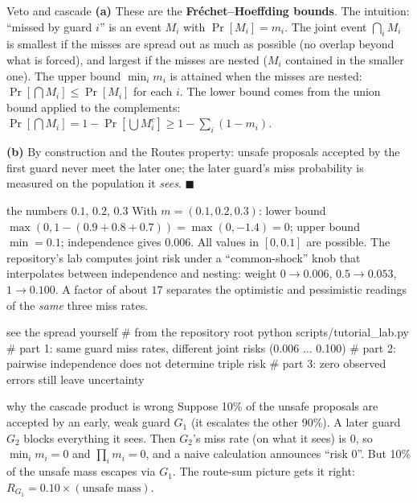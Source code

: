 \begin{plainproof}{Veto and cascade}
\textbf{(a)} These are the \textbf{Fr\'echet--Hoeffding bounds}. The intuition: ``missed by guard $i$'' is an event $M_i$ with $\Pr[M_i]=m_i$. The joint event $\bigcap_iM_i$ is smallest if the misses are spread out as much as possible (no overlap beyond what is forced), and largest if the misses are nested ($M_i$ contained in the smaller one). The upper bound $\min_im_i$ is attained when the misses are nested: $\Pr[\bigcap M_i]\le\Pr[M_i]$ for each $i$. The lower bound comes from the union bound applied to the complements: $\Pr[\bigcap M_i]=1-\Pr[\bigcup M_i^c]\ge1-\sum_i(1-m_i)$.

\textbf{(b)} By construction and the Routes property: unsafe proposals accepted by the first guard never meet the later one; the later guard's miss probability is measured on the population it \emph{sees}. \hfill$\blacksquare$
\end{plainproof}

\begin{example}{the numbers $0.1$, $0.2$, $0.3$}
With $m=(0.1,0.2,0.3)$: lower bound $\max(0,1-(0.9+0.8+0.7))=\max(0,-1.4)=0$; upper bound $\min=0.1$; independence gives $0.006$. All values in $[0,0.1]$ are possible. The repository's lab computes joint risk under a ``common-shock'' knob that interpolates between independence and nesting: weight $0\to0.006$, $0.5\to0.053$, $1\to0.100$. A factor of about $17$ separates the optimistic and pessimistic readings of the \emph{same} three miss rates.
\end{example}

\begin{tryit}{see the spread yourself}
# from the repository root
python scripts/tutorial_lab.py
# part 1: same guard miss rates, different joint risks (0.006 ... 0.100)
# part 2: pairwise independence does not determine triple risk
# part 3: zero observed errors still leave uncertainty
\end{tryit}

\begin{example}{why the cascade product is wrong}
Suppose 10\% of the unsafe proposals are accepted by an early, weak guard $G_1$ (it escalates the other 90\%). A later guard $G_2$ blocks everything it sees. Then $G_2$'s miss rate (on what it sees) is $0$, so $\min_im_i=0$ and $\prod_im_i=0$, and a naive calculation announces ``risk 0''. But 10\% of the unsafe mass escapes via $G_1$. The route-sum picture gets it right: $R_{G_1}=0.10\times(\text{unsafe mass})$.
\end{example}

